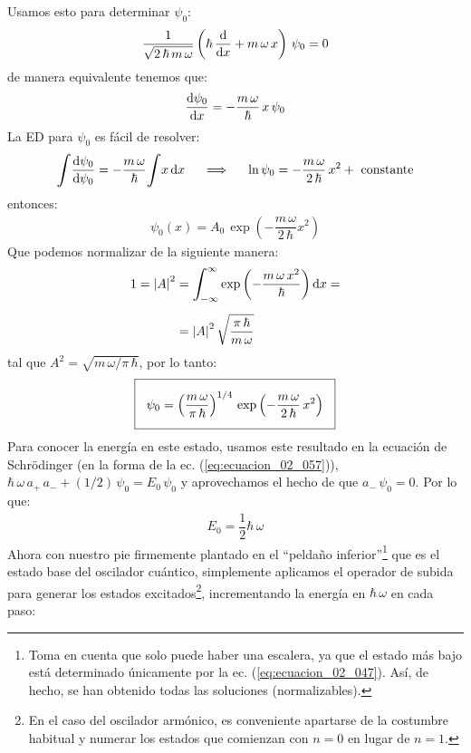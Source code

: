 \documentclass[12pt]{article}
\def\scaleint#1{\vcenter{\hbox{\scaleto[3ex]{\displaystyle\int}{#1}}}}
\def\bs{\mkern-12mu}
\numberwithin{equation}{section}
\begin{document}
Usamos esto para determinar $\psi_{0}$:
\begin{align*}
\dfrac{1}{\sqrt{2 \, \hbar \, m \, \omega}} \left( \hbar \, \dv{x} + m \, \omega \, x \right) \, \psi_{0} = 0
\end{align*}
de manera equivalente tenemos que:
\begin{align*}
\dv{\psi_{0}}{x} = - \dfrac{m \, \omega}{\hbar} \, x \, \psi_{0}
\end{align*}
La ED para $\psi_{0}$ es fácil de resolver:
\begin{align*}
\scaleint{6ex} \dv{\psi_{0}}{\psi_{0}} = - \dfrac{m \, \omega}{\hbar} \scaleint{6ex} x \dd{x} \hspace{0.5cm} \Longrightarrow \hspace{0.5cm} \ln \psi_{0} = - \dfrac{m \, \omega}{2 \, \hbar} \, x^{2} + \text{ constante}
\end{align*}
entonces:
\begin{align}
\psi_{0} (x) = A_{0} \, \exp \left( - \dfrac{m \, \omega}{2 \, \hbar} x^{2} \right)
\end{align}
Que podemos normalizar de la siguiente manera:
\begin{align*}
1 = \abs{A}^{2} &= \scaleint{6ex}_{\bs -\infty}^{\infty} \exp \left( - \dfrac{m \, \omega \, x^{2}}{\hbar} \right) \dd{x} = \\[0.5em]
&= \abs{A}^{2} \, \sqrt{\dfrac{\pi \, \hbar}{m \, \omega}}
\end{align*}
tal que $A^{2} = \sqrt{m \, \omega / \pi \, \hbar}$, por lo tanto:
\begin{align}
\setlength{\fboxsep}{3\fboxsep}\boxed{
\psi_{0} = \left( \dfrac{m \, \omega}{\pi \, \hbar} \right)^{1/4} \, \exp \left( - \dfrac{m \, \omega}{2 \, \hbar} \, x^{2} \right)
}
\label{eq:ecuacion_02_059}
\end{align}
Para conocer la energía en este estado, usamos este resultado en la ecuación de Schrödinger (en la forma de la ec. (\ref{eq:ecuacion_02_057})), $\hbar \, \omega \, a_{+} \, a_{-} + (1/2) \, \psi_{0}  = E_{0} \, \psi_{0}$ y aprovechamos el hecho de que $a_{-} \, \psi_{0} = 0$. Por lo que:
\begin{align}
E_{0} = \dfrac{1}{2} \hbar \, \omega
\label{eq:ecuacion_02_060}
\end{align}
Ahora con nuestro pie firmemente plantado en el \enquote{peldaño inferior}\footnote{Toma en cuenta que solo puede haber una escalera, ya que el estado más bajo está determinado únicamente por la ec. (\ref{eq:ecuacion_02_047}). Así, de hecho, se han obtenido todas las soluciones (normalizables).} que es el estado base del oscilador cuántico, simplemente aplicamos el operador de subida para generar los estados excitados\footnote{ En el caso del oscilador armónico, es conveniente apartarse de la costumbre habitual y numerar los estados que comienzan con $n = 0$ en lugar de $n = 1$.}, incrementando la energía en $\hbar \, \omega$ en cada paso:
\end{document}
